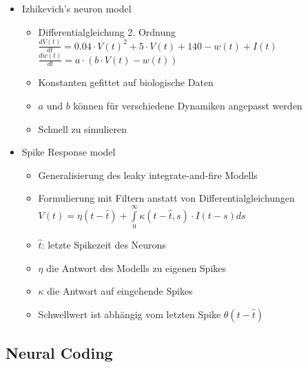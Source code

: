 \documentclass[paper=a4, fontsize=11pt]{scrartcl} %
\numberwithin{equation}{section} %
\numberwithin{figure}{section} %
\numberwithin{table}{section} %
\begin{document}
\begin{itemize}
\begin{itemize}
\begin{itemize}
\end{itemize}
\item Izhikevich's neuron model
\begin{itemize}
\item Differentialgleichung 2. Ordnung \\
$\frac{dV(t)}{dt} = 0.04 \cdot V(t)^2 + 5 \cdot V(t) + 140 - w(t) + I(t)$\\
$\frac{dw(t)}{dt} = a \cdot (b \cdot V(t) - w(t))$
\item Konstanten gefittet auf biologische Daten
\item $a$ und $b$ können für verschiedene Dynamiken angepasst werden
\item Schnell zu simulieren
\end{itemize}
\item Spike Response model
\begin{itemize}
\item Generalisierung des leaky integrate-and-fire Modells
\item Formulierung mit Filtern anstatt von Differentialgleichungen \\ $V(t) = \eta (t-\hat{t}) + \int\limits_0^\infty \kappa(t-\hat{t},s) \cdot I(t-s)ds$
\item $\hat{t}$: letzte Spikezeit des Neurons
\item $\eta$ die Antwort des Modells zu eigenen Spikes
\item $\kappa$ die Antwort auf eingehende Spikes
\item Schwellwert ist abhängig vom letzten Spike $\theta(t-\hat{t})$
\end{itemize}
\end{itemize}
\end{itemize}

\subsection{Neural Coding}
\end{document}

